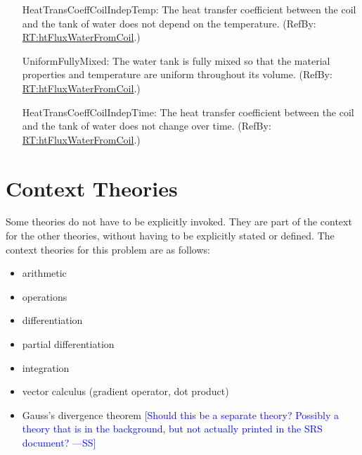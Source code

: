 \documentclass[12pt]{article}
\newcommand{\authornote}[3]{\textcolor{#1}{[#3 ---#2]}}
\newcommand{\authornote}[3]{}
\newcommand{\wss}[1]{\authornote{blue}{SS}{#1}}
\begin{document}
\begin{itemize}

\item[HeatTransCoeffCoilIndepTemp:\phantomsection\label{assumpHeatTransCoilIndepTemp}]
{The heat transfer coefficient between the coil and the tank of water does not
depend on the temperature. (RefBy:
\hyperref[RT:htFluxWaterFromCoil]{RT:htFluxWaterFromCoil}.)}
                
\item[UniformFullyMixed:\phantomsection\label{assumpFullyMixed}]
{The water tank is fully mixed so that the material properties and temperature
are uniform throughout its volume. (RefBy:
\hyperref[RT:htFluxWaterFromCoil]{RT:htFluxWaterFromCoil}.)}

\item[HeatTransCoeffCoilIndepTime:\phantomsection\label{assumpHeatTransCoilIndepTime}]
{The heat transfer coefficient between the coil and the tank of water does not
change over time. (RefBy:
\hyperref[RT:htFluxWaterFromCoil]{RT:htFluxWaterFromCoil}.)}
        
\end{itemize}


\section{Context Theories}

Some theories do not have to be explicitly invoked.  They are part of the
context for the other theories, without having to be explicitly stated or
defined.  The context theories for this problem are as follows: 

\begin{itemize}
  \item arithmetic
  \item operations 
  \item differentiation
  \item partial differentiation
  \item integration
  \item vector calculus (gradient operator, dot product)
  \item Gauss's divergence theorem \wss{Should this be a separate theory?  Possibly a theory that is in the background, but not actually printed in the SRS document?}
\end{itemize}

\end{document}
